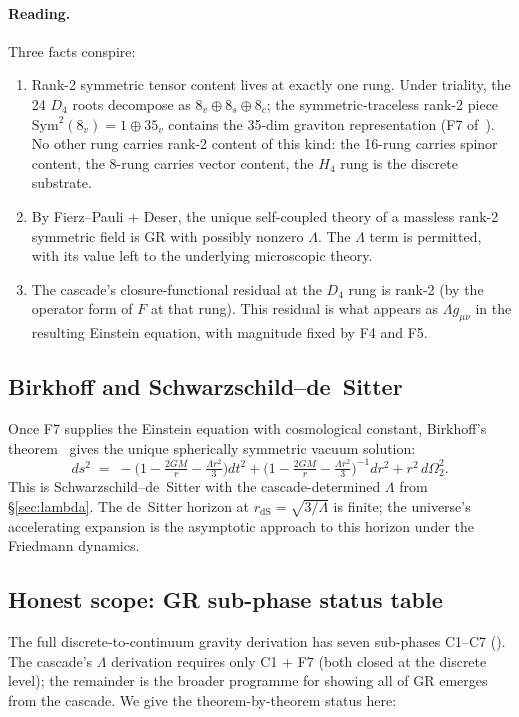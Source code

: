 \documentclass[11pt]{article}
\theoremstyle{plain}
\theoremstyle{definition}
\theoremstyle{remark}
\newcommand{\Sym}{\mathrm{Sym}}
\begin{document}
\paragraph{Reading.} Three facts conspire:
\begin{enumerate}
\item Rank-2 symmetric tensor content lives at exactly one rung. Under triality, the 24 $D_4$ roots decompose as $8_v \oplus 8_s \oplus 8_c$; the symmetric-traceless rank-2 piece $\Sym^2(8_v) = 1 \oplus 35_v$ contains the 35-dim graviton representation (F7 of~\citealp{SmartXXXVI}). No other rung carries rank-2 content of this kind: the 16-rung carries spinor content, the 8-rung carries vector content, the $H_4$ rung is the discrete substrate.
\item By Fierz--Pauli + Deser, the unique self-coupled theory of a massless rank-2 symmetric field is GR with possibly nonzero $\Lambda$. The $\Lambda$ term is permitted, with its value left to the underlying microscopic theory.
\item The cascade's closure-functional residual at the $D_4$ rung is rank-2 (by the operator form of $F$ at that rung). This residual is what appears as $\Lambda g_{\mu\nu}$ in the resulting Einstein equation, with magnitude fixed by F4 and F5.
\end{enumerate}

\subsection{Birkhoff and Schwarzschild--de~Sitter}

Once F7 supplies the Einstein equation with cosmological constant, Birkhoff's theorem~\citep{Birkhoff1923, Jebsen1921} gives the unique spherically symmetric vacuum solution:
\[
  ds^2 \;=\; -\Big(1 - \tfrac{2GM}{r} - \tfrac{\Lambda r^2}{3}\Big) dt^2 + \Big(1 - \tfrac{2GM}{r} - \tfrac{\Lambda r^2}{3}\Big)^{-1} dr^2 + r^2 \,d\Omega_2^2.
\]
This is Schwarzschild--de~Sitter with the cascade-determined $\Lambda$ from \S\ref{sec:lambda}. The de~Sitter horizon at $r_{\mathrm{dS}} = \sqrt{3/\Lambda}$ is finite; the universe's accelerating expansion is the asymptotic approach to this horizon under the Friedmann dynamics.

\subsection{Honest scope: GR sub-phase status table}\label{sec:gravity-status}

The full discrete-to-continuum gravity derivation has seven sub-phases C1--C7 (\citealp{cascadeGR}). The cascade's $\Lambda$ derivation requires only C1 + F7 (both closed at the discrete level); the remainder is the broader programme for showing all of GR emerges from the cascade. We give the theorem-by-theorem status here:
\end{document}
